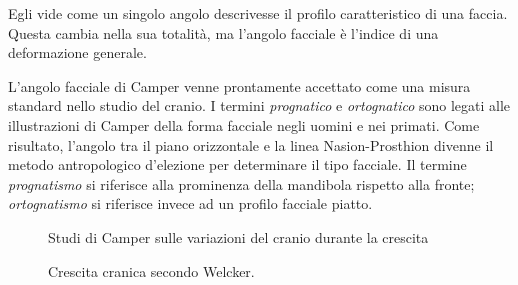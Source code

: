 Egli vide come un singolo angolo descrivesse il profilo caratteristico di una faccia. Questa cambia nella sua totalità, ma l'angolo facciale è l'indice di una deformazione generale.

L'angolo facciale di Camper venne prontamente accettato come una misura standard nello studio del cranio. I termini \textit{prognatico} e \textit{ortognatico} sono legati alle illustrazioni di Camper della forma facciale negli uomini e nei primati. Come risultato, l'angolo tra il piano orizzontale e la linea Nasion-Prosthion divenne il metodo antropologico d'elezione per determinare il tipo facciale. Il termine \textit{prognatismo} si riferisce alla prominenza della mandibola rispetto alla fronte; \textit{ortognatismo} si riferisce invece ad  un profilo facciale piatto.

\begin{figure}
 \centering
 \caption{Studi di Camper sulle variazioni del cranio durante la crescita}
 \label{fig:camper-crescita}
\end{figure}

\begin{figure}
 \centering
 \caption{Crescita cranica secondo Welcker.}
 \label{fig:welcker}
\end{figure}

